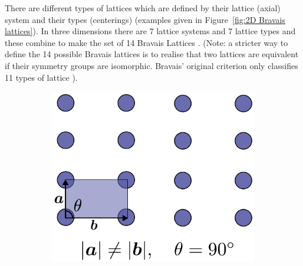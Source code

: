         There are different types of lattices which are defined by their lattice (axial) system and their types (centerings) (examples given in Figure~\ref{fig:2D Bravais lattices}).
        In three dimensions there are 7 lattice systems and 7 lattice types and these combine to make the set of 14 Bravais Lattices \cite{bravais1850Lattices}.
        (Note: a stricter way to define the 14 possible Bravais lattices is to realise that two lattices are equivalent if their symmetry groups are isomorphic.
        Bravais' original criterion only classifies 11 types of lattice \cite{pitteri1996definition}).
        \begin{figure}
            \centering
            \begin{subfigure}[b]{0.45\textwidth}
                    \centering
                    \includegraphics[width=\textwidth]{figures/introduction/rectangularbravaislattice.pdf}
                    \caption{}
                    \label{fig:2D rectangular Bravais lattice}
            \end{subfigure}
            \qquad
            \begin{subfigure}[b]{0.45\textwidth}
                    \centering

\end{subfigure}
\end{figure}
